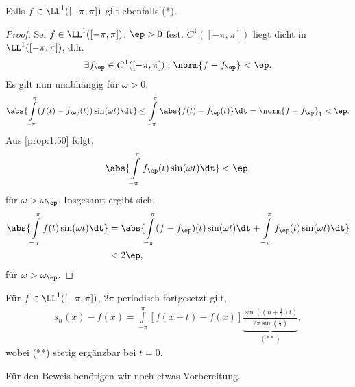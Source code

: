 \begin{lem}
\label{prop:1.51}
Falls $f\in\LL^1([-\pi,\pi])$ gilt ebenfalls (*).\fishhere
\end{lem}
\begin{proof}
Sei $f\in\LL^1([-\pi,\pi])$, $\ep>0$ fest. $C^1([-\pi,\pi])$ liegt dicht in
$\LL^1([-\pi,\pi])$, d.h.
\begin{align*}
\exists f_\ep\in C^1([-\pi,\pi]) : \norm{f-f_\ep} <\ep.
\end{align*}
Es gilt nun unabhängig für $\omega > 0$,
\begin{align*}
\abs{\int\limits_{-\pi}^\pi (f(t)-f_\ep(t))\sin(\omega t)\dt}
\le \int\limits_{-\pi}^\pi \abs{f(t)-f_\ep(t)}\dt = \norm{f-f_\ep}_1 < \ep.
\end{align*}
Aus \ref{prop:1.50} folgt,
\begin{align*}
\abs{\int\limits_{-\pi}^\pi f_\ep(t)\sin(\omega t)\dt} <\ep,
\end{align*}
für $\omega > \omega_\ep$. Insgesamt ergibt sich,
\begin{align*}
\abs{\int\limits_{-\pi}^\pi f(t)\sin(\omega t)\dt}
&= \abs{\int\limits_{-\pi}^\pi (f-f_\ep)(t)\sin(\omega t)\dt +
\int\limits_{-\pi}^\pi f_\ep(t)\sin(\omega t)\dt} \\ &< 2\ep,
\end{align*}
für $\omega > \omega_\ep$.\qedhere
\end{proof}

\begin{lem}
\label{prop:1.52}
Für $f\in \LL^1([-\pi,\pi])$, $2\pi$-periodisch fortgesetzt gilt,
\begin{align*}
s_n(x)-f(x) = \int\limits_{-\pi}^\pi \left[f(x+t) -
f(x)\right]\underbrace{\frac{\sin\left(\left(n+\frac{1}{2}\right)t\right)}
{2\pi\sin\left(\frac{t}{2}\right)}}_{(**)},
\end{align*}
wobei (**) stetig ergänzbar bei $t=0$.\fishhere
\end{lem}

Für den Beweis benötigen wir noch etwas Vorbereitung.

